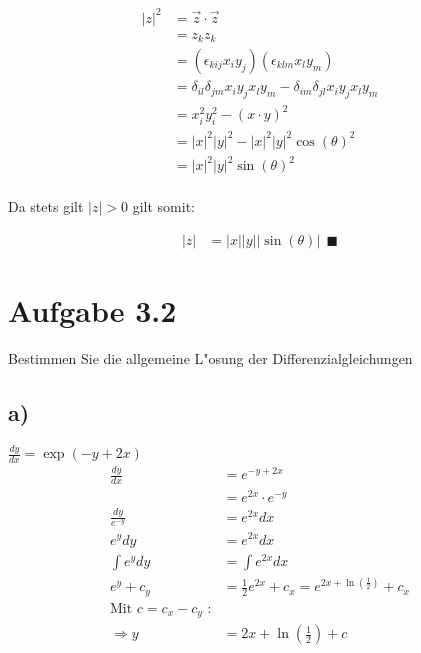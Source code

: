 \documentclass{theozettel}
\begin{document}
\begin{align}
|z|^{2} &=  \vec{z} \cdot \vec{z} \\
&= z_k z_k \\
&= (\epsilon_{kij} x_i y_j) (\epsilon_{klm} x_l y_m) \\
&= \delta_{il} \delta_{jm} x_i y_j x_l y_m - \delta_{im} \delta_{jl} x_i y_j x_l y_m \\
&= x_i^{2} y_i^{2} - (x \cdot y)^{2} \\
&= |x|^{2} |y|^{2} -  |x|^{2} |y|^{2} \cos(\theta)^{2} \\
&= |x|^{2} |y|^{2} \sin(\theta)^{2} \\
\end{align}

Da stets gilt $|z| > 0$ gilt somit:

\begin{align}
|z| &= |x| |y| |\sin(\theta)|\ \ \blacksquare
\end{align}

\newpage
\section*{Aufgabe 3.2} Bestimmen Sie die allgemeine L"osung der Differenzialgleichungen\\
\subsection*{a)} $\frac{dy}{dx} = \exp\left(-y+2x\right)$\\
\begin{align*}
					\frac{dy}{dx} 	&= e^{-y+2x}\\
									&= e^{2x}\cdot e^{-y}\\
\frac{dy}{e^{-y}}	&= e^{2x} dx\\
e^y dy  &= e^{2x} dx\\
\int{e^y dy} &= \int{e^{2x} dx}\\
e^y +c_y &= \frac{1}{2} e^{2x} + c_x = e^{2x+ \ln\left(\frac{1}{2}\right)}+c_x\\
\text{Mit }c=c_x-c_y \text{ :}\\
\Rightarrow y&= 2x+ \ln{\left(\frac{1}{2}\right)}+c
\end{align*}
\end{document}
